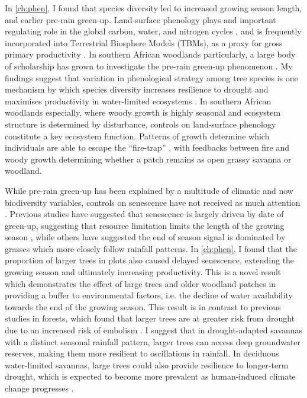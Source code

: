 \begin{refsection}
In \autoref{ch:phen}, I found that species diversity led to increased growing season length, and earlier pre-rain green-up. Land-surface phenology plays and important regulating role in the global carbon, water, and nitrogen cycles \citep{Richardson2013}, and is frequently incorporated into Terrestrial Biosphere Models (TBMs), as a proxy for gross primary productivity \citep{Bloom2016}. In southern African woodlands particularly, a large body of scholarship has grown to investigate the pre-rain green-up phenomenon \citep{Ryan2017, Adole2018a}. My findings suggest that variation in phenological strategy among tree species is one mechanism by which species diversity increases resilience to drought and maximises productivity in water-limited ecosystems \citep{Stan2019, Morellato2016}. In southern African woodlands especially, where woody growth is highly seasonal and ecosystem structure is determined by disturbance, controls on land-surface phenology constitute a key ecosystem function. Patterns of growth determine which individuals are able to escape the ``fire-trap'' \citep{Dantas2013}, with feedbacks between fire and woody growth determining whether a patch remains as open grassy savanna or woodland.

While pre-rain green-up has been explained by a multitude of climatic and now biodiversity variables, controls on senescence have not received as much attention \citep{Gallinat2015}. Previous studies have suggested that senescence is largely driven by date of green-up, suggesting that resource limitation limits the length of the growing season \citep{Zani2020}, while others have suggested the end of season signal is dominated by grasses which more closely follow rainfall patterns. In \autoref{ch:phen}, I found that the proportion of larger trees in plots also caused delayed senescence, extending the growing season and ultimately increasing productivity. This is a novel result which demonstrates the effect of large trees and older woodland patches in providing a buffer to environmental factors, i.e. the decline of water availability towards the end of the growing season. This result is in contrast to previous studies in forests, which found that larger trees are at greater risk from drought due to an increased risk of embolism \citep{Bennett2015}. I suggest that in drought-adapted savannas with a distinct seasonal rainfall pattern, larger trees can access deep groundwater reserves, making them more resilient to oscillations in rainfall. In deciduous water-limited savannas, large trees could also provide resilience to longer-term drought, which is expected to become more prevalent as human-induced climate change progresses \citep{Kusangaya2014}. 


\end{refsection}
